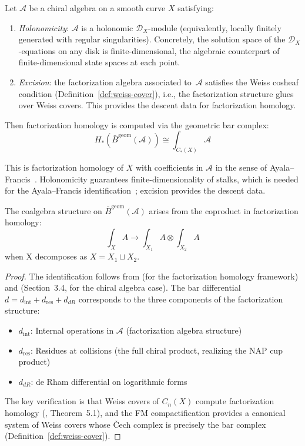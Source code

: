 \begin{theorem}\label{thm:bar-NAP-homology}\label{thm:bar-computes-chiral-homology}
Let $\mathcal{A}$ be a chiral algebra on a smooth curve $X$ satisfying:
\begin{enumerate}[label=\textup{(\roman*)}]
\item \emph{Holonomicity}: $\mathcal{A}$ is a holonomic
 $\mathcal{D}_X$-module (equivalently, locally finitely generated
 with regular singularities). Concretely, the solution space of the
 $\mathcal{D}_X$-equations on any disk is finite-dimensional, the
 algebraic counterpart of finite-dimensional state spaces at each
 point.
\item \emph{Excision}: the factorization algebra associated
 to~$\mathcal{A}$ satisfies the Weiss cosheaf condition
 (Definition~\ref{def:weiss-cover}), i.e., the
 factorization structure glues over Weiss covers. This
 provides the descent data for factorization homology.
\end{enumerate}
Then factorization homology is computed via the geometric bar complex:
\[H_*(\bar{B}^{\text{geom}}(\mathcal{A})) \cong \int_{C_*(X)} \mathcal{A}\]

This is factorization homology of $X$ with coefficients in $\mathcal{A}$ in the sense of Ayala--Francis~\cite{AF15}. Holonomicity guarantees finite-dimensionality of stalks, which is needed for the Ayala--Francis identification~\cite[Theorem~5.1]{AF15}; excision provides the descent data.

The coalgebra structure on $\bar{B}^{\text{geom}}(\mathcal{A})$ arises from the coproduct in factorization homology:
\[\int_X A \to \int_{X_1} A \otimes \int_{X_2} A\]
when X decomposes as $X = X_1 \sqcup X_2$.
\end{theorem}

\begin{proof}
The identification follows from \cite{AF15} (for the factorization homology framework) and \cite{BD04} (Section~3.4, for the chiral algebra case). The bar differential $d = d_{\text{int}} + d_{\text{res}} + d_{dR}$ corresponds to the three components of the factorization structure:
\begin{itemize}
\item $d_{\text{int}}$: Internal operations in $\mathcal{A}$ (factorization algebra structure)
\item $d_{\text{res}}$: Residues at collisions (the full chiral product, realizing the NAP cup product)
\item $d_{dR}$: de Rham differential on logarithmic forms
\end{itemize}
The key verification is that Weiss covers of $C_n(X)$ compute factorization homology (\cite{AF15}, Theorem~5.1), and the FM compactification provides a canonical system of Weiss covers whose \v{C}ech complex is precisely the bar complex (Definition~\ref{def:weiss-cover}).
\end{proof}

